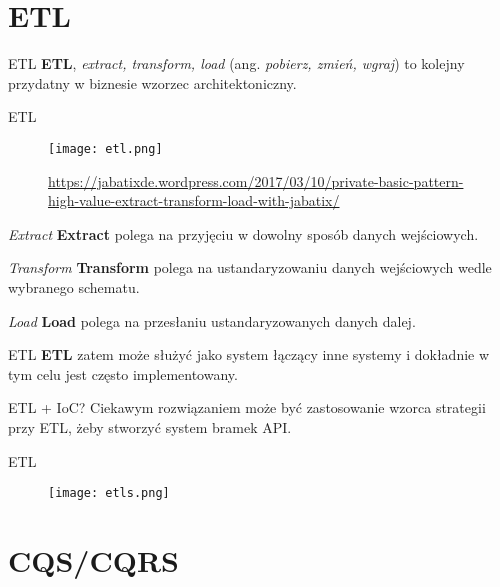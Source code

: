 \section{ETL}

\begin{frame}{ETL}
	\textbf{ETL}, \emph{extract, transform, load} (ang. \emph{pobierz, zmień, wgraj}) to kolejny przydatny w biznesie wzorzec architektoniczny.
\end{frame}

\begin{frame}{ETL}
	\begin{figure}[t]
		\centering
		\texttt{[image: etl.png]}
		\caption{\url{https://jabatixde.wordpress.com/2017/03/10/private-basic-pattern-high-value-extract-transform-load-with-jabatix/}}
	\end{figure}
\end{frame}

\begin{frame}{\emph{Extract}}
	\textbf{Extract} polega na przyjęciu w dowolny sposób danych wejściowych.
\end{frame}

\begin{frame}{\emph{Transform}}
	\textbf{Transform} polega na ustandaryzowaniu danych wejściowych wedle wybranego schematu.
\end{frame}

\begin{frame}{\emph{Load}}
	\textbf{Load} polega na przesłaniu ustandaryzowanych danych dalej.
\end{frame}

\begin{frame}{ETL}
	\textbf{ETL} zatem może służyć jako system łączący inne systemy i dokładnie w tym celu jest często implementowany.
\end{frame}

\begin{frame}{ETL + IoC?}
	Ciekawym rozwiązaniem może być zastosowanie wzorca strategii przy ETL, żeby stworzyć system bramek API.
\end{frame}

\begin{frame}{ETL}
	\begin{figure}[t]
		\centering
		\texttt{[image: etls.png]}
	\end{figure}
\end{frame}

\section{CQS/CQRS}

